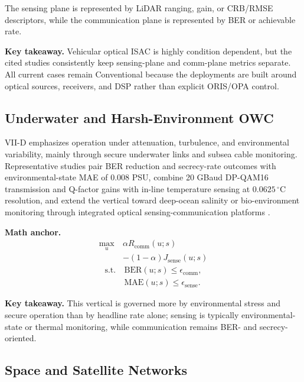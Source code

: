 The sensing plane is represented by LiDAR ranging, gain, or CRB/RMSE descriptors, while the communication plane is represented by BER or achievable rate.

\textbf{Key takeaway.} Vehicular optical ISAC is highly condition dependent, but the cited studies consistently keep sensing-plane and comm-plane metrics separate. All current cases remain Conventional because the deployments are built around optical sources, receivers, and DSP rather than explicit ORIS/OPA control.

\subsection{Underwater and Harsh-Environment OWC}

VII-D emphasizes operation under attenuation, turbulence, and environmental variability, mainly through secure underwater links and subsea cable monitoring. Representative studies pair BER reduction and secrecy-rate outcomes with environmental-state MAE of 0.008 PSU, combine 20 GBaud DP-QAM16 transmission and Q-factor gains with in-line temperature sensing at $0.0625\,^{\circ}\mathrm{C}$ resolution, and extend the vertical toward deep-ocean salinity or bio-environment monitoring through integrated optical sensing-communication platforms \cite{O_ISAC_027,O_ISAC_127,O_ISAC_130,O_ISAC_220}.

\textbf{Math anchor.}
\begin{equation}
    \begin{split}
        \max_u\  & \alpha R_{\mathrm{comm}}(u;s)      \\
                 & -(1-\alpha)J_{\mathrm{sense}}(u;s)
    \end{split}
\end{equation}
\begin{equation}
    \begin{split}
        \text{s.t.}\  & \mathrm{BER}(u;s)\le \epsilon_{\mathrm{comm}},  \\
                      & \mathrm{MAE}(u;s)\le \epsilon_{\mathrm{sense}}.
    \end{split}
\end{equation}

\textbf{Key takeaway.} This vertical is governed more by environmental stress and secure operation than by headline rate alone; sensing is typically environmental-state or thermal monitoring, while communication remains BER- and secrecy-oriented.

\subsection{Space and Satellite Networks}

